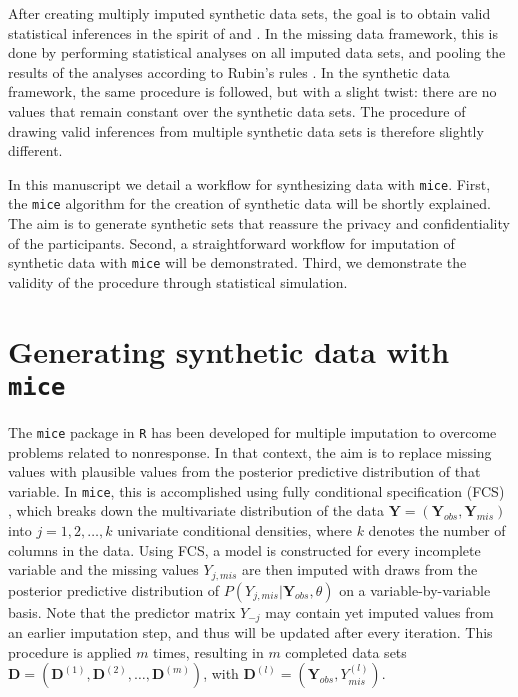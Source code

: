 \documentclass[psych,article,submit,moreauthors,pdftex]{mdpi}
\begin{document}
After creating multiply imputed synthetic data sets, the goal is to
obtain valid statistical inferences in the spirit of
\citet{rubin_multiple_1987} and \citet{neyman1934}. In the missing data
framework, this is done by performing statistical analyses on all
imputed data sets, and pooling the results of the analyses according to
Rubin's rules \citep[p.~76]{rubin_multiple_1987}. In the synthetic data
framework, the same procedure is followed, but with a slight twist:
there are no values that remain constant over the synthetic data sets.
The procedure of drawing valid inferences from multiple synthetic data
sets is therefore slightly different.

In this manuscript we detail a workflow for synthesizing data with
\texttt{mice}. First, the \texttt{mice} algorithm for the creation of
synthetic data will be shortly explained. The aim is to generate
synthetic sets that reassure the privacy and confidentiality of the
participants. Second, a straightforward workflow for imputation of
synthetic data with \texttt{mice} will be demonstrated. Third, we
demonstrate the validity of the procedure through statistical
simulation.

\hypertarget{generating-synthetic-data-with-mice}{%
\section{\texorpdfstring{Generating synthetic data with
\texttt{mice}}{Generating synthetic data with mice}}\label{generating-synthetic-data-with-mice}}

The \texttt{mice} package \citep{mice} in \texttt{R} \citep{Rproject}
has been developed for multiple imputation to overcome problems related
to nonresponse. In that context, the aim is to replace missing values
with plausible values from the posterior predictive distribution of that
variable. In \texttt{mice}, this is accomplished using fully conditional
specification (FCS) \citep{vanbuuren_fully_2006}, which breaks down the
multivariate distribution of the data
\(\textbf{Y} = (\textbf{Y}_{obs}, \textbf{Y}_{mis})\) into
\(j = 1, 2, \dots, k\) univariate conditional densities, where \(k\)
denotes the number of columns in the data. Using FCS, a model is
constructed for every incomplete variable and the missing values
\(Y_{j, mis}\) are then imputed with draws from the posterior predictive
distribution of \(P(Y_{j, mis} | \textbf{Y}_{obs}, \theta)\) on a
variable-by-variable basis. Note that the predictor matrix \(Y_{-j}\)
may contain yet imputed values from an earlier imputation step, and thus
will be updated after every iteration. This procedure is applied \(m\)
times, resulting in \(m\) completed data sets
\(\textbf{D} = (\textbf{D}^{(1)}, \textbf{D}^{(2)}, \dots, \textbf{D}^{(m)})\),
with \(\textbf{D}^{(l)} = (\textbf{Y}_{obs}, Y^{(l)}_{mis})\).
\end{document}
